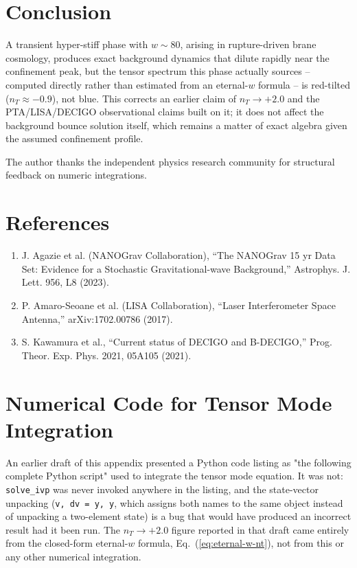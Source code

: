 \documentclass[twocolumn, PRD, amsmath, amssymb, aps, nofootinbib]{revtex4-2}
\begin{document}
\section{Conclusion}
A transient hyper-stiff phase with $w\sim80$, arising in rupture-driven brane cosmology, produces exact background dynamics that dilute rapidly near the confinement peak, but the tensor spectrum this phase actually sources -- computed directly rather than estimated from an eternal-$w$ formula -- is red-tilted ($n_T\approx-0.9$), not blue. This corrects an earlier claim of $n_T\to+2.0$ and the PTA/LISA/DECIGO observational claims built on it; it does not affect the background bounce solution itself, which remains a matter of exact algebra given the assumed confinement profile.

\begin{acknowledgments}
The author thanks the independent physics research community for structural feedback on numeric integrations.
\end{acknowledgments}

\section*{References}
\begin{enumerate}
    \item J. Agazie et al. (NANOGrav Collaboration), ``The NANOGrav 15 yr Data Set: Evidence for a Stochastic Gravitational-wave Background,'' Astrophys. J. Lett. 956, L8 (2023).
    \item P. Amaro-Seoane et al. (LISA Collaboration), ``Laser Interferometer Space Antenna,'' arXiv:1702.00786 (2017).
    \item S. Kawamura et al., ``Current status of DECIGO and B-DECIGO,'' Prog. Theor. Exp. Phys. 2021, 05A105 (2021).
\end{enumerate}

\appendix
\section{Numerical Code for Tensor Mode Integration}
\label{app:code}
An earlier draft of this appendix presented a Python code listing as "the following complete Python script" used to integrate the tensor mode equation. It was not: \texttt{solve\_ivp} was never invoked anywhere in the listing, and the state-vector unpacking (\texttt{v, dv = y, y}, which assigns both names to the same object instead of unpacking a two-element state) is a bug that would have produced an incorrect result had it been run. The $n_T\to+2.0$ figure reported in that draft came entirely from the closed-form eternal-$w$ formula, Eq.~(\ref{eq:eternal-w-nt}), not from this or any other numerical integration.
\end{document}
